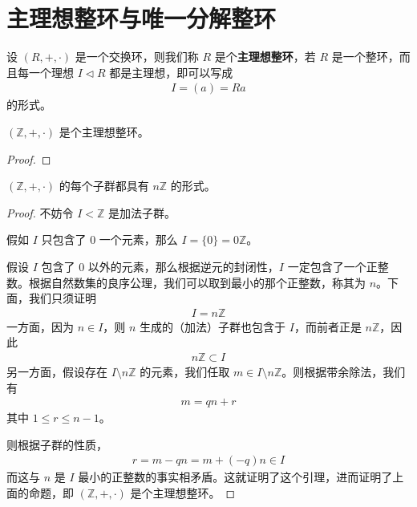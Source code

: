 \documentclass[../../main.tex]{subfiles}
\begin{document}
\section{主理想整环与唯一分解整环}

\begin{definition}[主理想整环]
设 $(R, +, \cdot)$ 是一个交换环，则我们称 $R$ 是个\textbf{主理想整环}，若 $R$ 是一个整环，而且每一个理想 $I \lhd R$ 都是主理想，即可以写成
\begin{align*}
I = (a) = Ra
\end{align*}
的形式。
\end{definition}

\begin{proposition}
$(\mathbb{Z}, +, \cdot)$ 是个主理想整环。
\end{proposition}
\begin{proof}

\end{proof}

\begin{lemma}
$(\mathbb{Z}, +, \cdot)$ 的每个子群都具有 $n\mathbb{Z}$ 的形式。
\end{lemma}
\begin{proof}
不妨令 $I < \mathbb{Z}$ 是加法子群。

假如 $I$ 只包含了 $0$ 一个元素，那么 $I = \{0\} = 0\mathbb{Z}$。

假设 $I$ 包含了 $0$ 以外的元素，那么根据逆元的封闭性，$I$ 一定包含了一个正整数。根据自然数集的良序公理，我们可以取到最小的那个正整数，称其为 $n$。下面，我们只须证明
\begin{align*}
I = n\mathbb{Z}
\end{align*}
一方面，因为 $n \in I$，则 $n$ 生成的（加法）子群也包含于 $I$，而前者正是 $n\mathbb{Z}$，因此
\begin{align*}
n\mathbb{Z} \subset I
\end{align*}
另一方面，假设存在 $I \setminus n\mathbb{Z}$ 的元素，我们任取 $m \in I \setminus n\mathbb{Z}$。则根据带余除法，我们有
\begin{align*}
m = qn + r
\end{align*}
其中 $1 \leqslant r \leqslant n - 1$。

则根据子群的性质，
\begin{align*}
r = m - qn = m + (-q)n \in I
\end{align*}
而这与 $n$ 是 $I$ 最小的正整数的事实相矛盾。这就证明了这个引理，进而证明了上面的命题，即 $(\mathbb{Z}, +, \cdot)$ 是个主理想整环。 
\end{proof}
\end{document}
